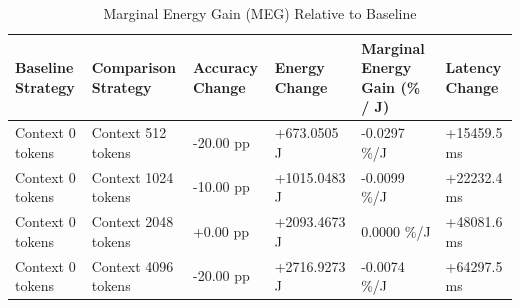 \begin{table}
\caption{Marginal Energy Gain (MEG) Relative to Baseline}
\label{tab:marginal_energy_gain}
\begin{tabular}{llllll}
\toprule
Baseline Strategy & Comparison Strategy & Accuracy Change & Energy Change & Marginal Energy Gain (\% / J) & Latency Change \\
\midrule
Context 0 tokens & Context 512 tokens & -20.00 pp & +673.0505 J & -0.0297 \%/J & +15459.5 ms \\
Context 0 tokens & Context 1024 tokens & -10.00 pp & +1015.0483 J & -0.0099 \%/J & +22232.4 ms \\
Context 0 tokens & Context 2048 tokens & +0.00 pp & +2093.4673 J & 0.0000 \%/J & +48081.6 ms \\
Context 0 tokens & Context 4096 tokens & -20.00 pp & +2716.9273 J & -0.0074 \%/J & +64297.5 ms \\
\bottomrule
\end{tabular}
\end{table}
